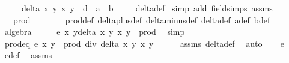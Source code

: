 \begin{isabellebody}
\ \ \ \ \ {\isacharparenleft}delta\ x{}\ y{}\ x{}\ y{}{\isacharparenright}\ {\isacharminus}\ d\ {\isacharasterisk}\ a\ {\isacharasterisk}\ b\isanewline
\ \ \ \isamarkupfalse%
\ delta{\isacharunderscore}def\ \isamarkupfalse%
{\isacharparenleft}simp\ add{\isacharcolon}\ field{\isacharunderscore}simps\ assms{\isacharparenleft}{}{\isacharcomma}{}{\isacharparenright}{\isacharparenright}{\isacharplus}\isanewline
\ \ \isamarkupfalse%
\ \isamarkupfalse%
\ {\isachardoublequoteopen}{\isachardot}{\isachardot}{\isachardot}\ {\isacharminus}\ prod\ {\isacharequal}\ {}{\isachardoublequoteclose}\isanewline
\ \ \ \ \isamarkupfalse%
\ prod{\isacharunderscore}def\ delta{\isacharunderscore}plus{\isacharunderscore}def\ delta{\isacharunderscore}minus{\isacharunderscore}def\ delta{\isacharunderscore}def\ a{\isacharunderscore}def\ b{\isacharunderscore}def\ \isamarkupfalse%
\ algebra\isanewline
\ \ \isamarkupfalse%
\ \isamarkupfalse%
\ {\isachardoublequoteopen}{\isacharparenleft}e\ x{}\ y{}{\isacharparenright}{\isacharasterisk}{\isacharparenleft}delta\ x{}\ y{}\ x{}\ y{}{\isacharparenright}\ {\isacharequal}\ prod{\isachardoublequoteclose}\ \isamarkupfalse%
\ simp\isanewline
\ \ \isamarkupfalse%
\ \isamarkupfalse%
\ prod{\isacharunderscore}eq{\isacharunderscore}{}{\isacharcolon}\ {\isachardoublequoteopen}{\isacharparenleft}e\ x{}\ y{}{\isacharparenright}\ {\isacharequal}\ prod\ div\ {\isacharparenleft}delta\ x{}\ y{}\ x{}\ y{}{\isacharparenright}\isanewline
\ \ \ \ \isamarkupfalse%
\ assms{\isacharparenleft}{}{\isacharcomma}{}{\isacharparenright}\ delta{\isacharunderscore}def\ \isamarkupfalse%
\ auto\isanewline
\isanewline
\ \ \isamarkupfalse%
\ {\isachardoublequoteopen}e{}\ {\isacharequal}\ {}{\isachardoublequoteclose}\ \isamarkupfalse%
\ e{}{\isacharunderscore}def\ \isamarkupfalse%
\ assms{\isacharparenleft}{}{\isacharparenright}\ \isamarkupfalse%

\end{isabellebody}
